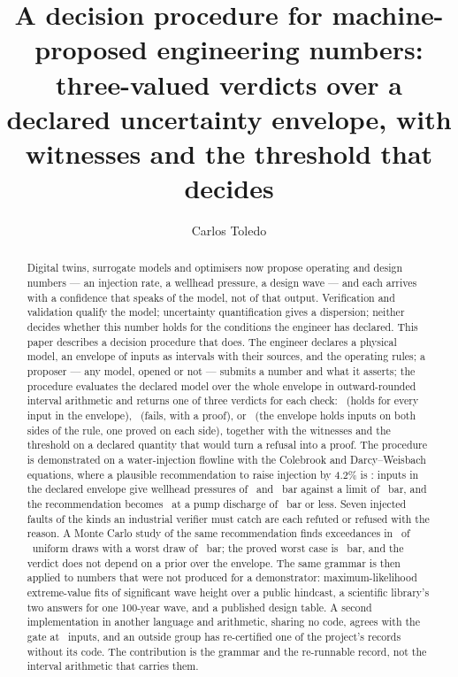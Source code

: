 \documentclass[preprint,11pt,authoryear]{elsarticle}
\begin{document}
\begin{frontmatter}

\title{A decision procedure for machine-proposed engineering numbers: three-valued verdicts over a declared uncertainty envelope, with witnesses and the threshold that decides}

\author[a]{Carlos Toledo}

\begin{abstract}
Digital twins, surrogate models and optimisers now propose operating and design numbers --- an injection rate, a wellhead pressure, a design wave --- and each arrives with a confidence that speaks of the model, not of that output. Verification and validation qualify the model; uncertainty quantification gives a dispersion; neither decides whether this number holds for the conditions the engineer has declared. This paper describes a decision procedure that does. The engineer declares a physical model, an envelope of inputs as intervals with their sources, and the operating rules; a proposer --- any model, opened or not --- submits a number and what it asserts; the procedure evaluates the declared model over the whole envelope in outward-rounded interval arithmetic and returns one of three verdicts for each check: \vProved\ (holds for every input in the envelope), \vRefuted\ (fails, with a proof), or \vRefused\ (the envelope holds inputs on both sides of the rule, one proved on each side), together with the witnesses and the threshold on a declared quantity that would turn a refusal into a proof. The procedure is demonstrated on a water-injection flowline with the Colebrook and Darcy--Weisbach equations, where a plausible recommendation to raise injection by 4.2\% is \vRefused: inputs in the declared envelope give wellhead pressures of \GCornerAbove\ and \GCornerBelow\ bar against a limit of \GRulePwh\ bar, and the recommendation becomes \vProved\ at a pump discharge of \GFlipGreen\ bar or less. Seven injected faults of the kinds an industrial verifier must catch are each refuted or refused with the reason. A Monte Carlo study of the same recommendation finds exceedances in \MPOver\ of \MDraws\ uniform draws with a worst draw of \MMax\ bar; the proved worst case is \GCornerAbove\ bar, and the verdict does not depend on a prior over the envelope. The same grammar is then applied to numbers that were not produced for a demonstrator: maximum-likelihood extreme-value fits of significant wave height over a public hindcast, a scientific library's two answers for one 100-year wave, and a published design table. A second implementation in another language and arithmetic, sharing no code, agrees with the gate at \GRefPoints\ inputs, and an outside group has re-certified one of the project's records without its code. The contribution is the grammar and the re-runnable record, not the interval arithmetic that carries them.

\end{abstract}
\end{frontmatter}
\end{document}
